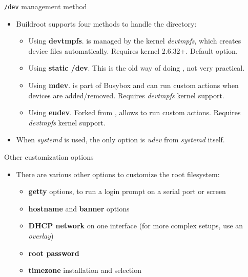 \begin{frame}{{\tt /dev} management method}
  \begin{itemize}
  \item Buildroot supports four methods to handle the 
    directory:
    \begin{itemize}
    \item Using {\bf devtmpfs}.  is managed by the kernel
      {\em devtmpfs}, which creates device files
      automatically. Requires kernel 2.6.32+. Default option.
    \item Using {\bf static /dev}. This is the old way of doing
      , not very practical.
    \item Using {\bf mdev}.  is part of Busybox and can run
      custom actions when devices are added/removed. Requires {\em
        devtmpfs} kernel support.
    \item Using {\bf eudev}. Forked from , allows to run
      custom actions. Requires {\em devtmpfs} kernel support.
    \end{itemize}
  \item When {\em systemd} is used, the only option is {\em udev} from
    {\em systemd} itself.
  \end{itemize}
\end{frame}

\begin{frame}{Other customization options}
  \begin{itemize}
  \item There are various other options to customize the root
    filesystem:
    \begin{itemize}
    \item {\bf getty} options, to run a login prompt on a serial port
      or screen
    \item {\bf hostname} and {\bf banner} options
    \item {\bf DHCP network} on one interface (for more complex
      setups, use an {\em overlay})
    \item {\bf root password}
    \item {\bf timezone} installation and selection
    \end{itemize}
  \end{itemize}
\end{frame}

